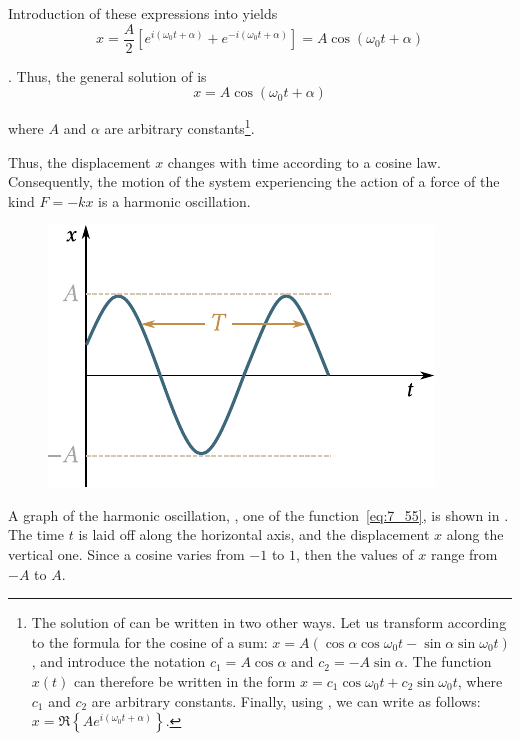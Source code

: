 \noindent
Introduction of these expressions into  yields
\begin{equation}\label{eq:7_54}
	x = \frac{A}{2}\left[e^{i(\omega_0 t+\alpha)} + e^{-i(\omega_0 t+\alpha)}\right] = A\cos(\omega_0 t + \alpha)
\end{equation}

. Thus, the general solution of  is
\begin{equation}\label{eq:7_55}
	x = A\cos(\omega_0 t + \alpha)
\end{equation}

\noindent
where $A$ and $\alpha$ are arbitrary constants\footnote{The solution of  can be written in two other ways. Let us transform  according to the formula for the cosine of a sum: $x = A(\cos\alpha\cos\omega_0 t - \sin\alpha\sin\omega_0 t)$, and introduce the notation $c_1=A\cos\alpha$ and $c_2=-A\sin\alpha$. The function $x(t)$ can therefore be written in the form $x=c_1\cos\omega_0 t+c_2\sin\omega_0 t$, where $c_1$ and $c_2$ are arbitrary constants. Finally, using , we can write  as follows: $x=\Re\left\{Ae^{i(\omega_0 t+\alpha)}\right\}$.}.

Thus, the displacement $x$ changes with time according to a cosine law. Consequently, the motion of the system experiencing the action of a force of the kind $F=-kx$ is a harmonic oscillation.

\begin{figure}[t]
	\begin{center}
		\includegraphics[scale=0.95]{figures/ch_07/fig_7_4.pdf}
		\caption[]{}
		\label{fig:7_4}
	\end{center}
	\vspace{-0.7cm}
\end{figure}

A graph of the harmonic oscillation, \ie, one of the function~\eqref{eq:7_55}, is shown in . The time $t$ is laid off along the horizontal axis, and the displacement $x$ along the vertical one. Since a cosine varies from $-1$ to $1$, then the values of $x$ range from $-A$ to $A$.

